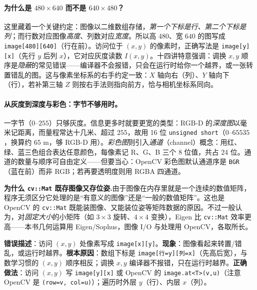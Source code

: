\paragraph{为什么是 $480\times640$ 而不是 $640\times480$？}
这里藏着一个关键约定\cite{gaoxiang2019slam14}：图像以二维数组存储，\emph{第一个下标是行、第二个下标是列}；而行数对应图像\emph{高度}、列数对应\emph{宽度}。所以高 $480$、宽 $640$ 的图写成 \texttt{image[480][640]}（行在前）。访问位于 $(x,y)$ 的像素时，正确写法是 \texttt{image[y][x]}（先行 $y$ 后列 $x$），它对应灰度读数 $I(x,y)$。十四讲特意强调\cite{gaoxiang2019slam14}：调换 $x,y$ 顺序是\emph{隐蔽}的常见错误——编译器不会报错，只会在运行时给你一个越界，或一张转置错乱的图。这与像素坐标系的右手约定一致：$X$ 轴向右（列）、$Y$ 轴向下（行），若补第三轴 $Z$ 则按右手法则指向前方，恰与相机坐标系同向。

\paragraph{从灰度到深度与彩色：字节不够用时。}
一字节（$0\text{–}255$）只够灰度。信息更多时就要更宽的类型\cite{gaoxiang2019slam14}：RGB-D 的\emph{深度图}以毫米记距离，而量程常达十几米、超过 $255$，故用 16 位 \texttt{unsigned short}（$0\text{–}65535$，换算约 $65$ m，够 RGB-D 用）。\emph{彩色图}则引入\emph{通道}（channel）概念：用红、绿、蓝三色组合表达任意颜色，每像素记 R、G、B 三个 8 位值，共占 24 位。通道的数量与顺序可自由定义——但要当心：OpenCV 彩色图默认通道序是 \texttt{BGR}（蓝在前）而非 RGB；若再要透明度则用 RGBA 四通道。

\begin{note}
\textbf{为什么 \texttt{cv::Mat} 既存图像又存位姿.}\;由于图像在内存里就是一个连续的数值矩阵，程序无须区分它处理的是“有意义的图像”还是“一般的数值矩阵”\cite{gaoxiang2019slam14}。这也是 OpenCV 的 \texttt{cv::Mat} 既能装图像、又能装位姿等矩阵数据的原因。不过一般认为，对\emph{固定大小}的小矩阵（如 $3\times3$ 旋转、$4\times4$ 变换），Eigen 比 \texttt{cv::Mat} 效率更高——本书几何运算用 Eigen/Sophus，图像 I/O 与处理用 OpenCV，各取所长。
\end{note}

\begin{pitfall}
\textbf{错误描述}：访问 $(x,y)$ 处像素写成 \texttt{image[x][y]}。\textbf{现象}：图像看起来转置/错乱，或运行时越界。\textbf{根本原因}：数组下标是 \texttt{image[行=y][列=x]}（先高后宽），与数学习惯的 $(x,y)$ 顺序相反；调换 $x,y$ 编译器不报错，只在运行时越界\cite{gaoxiang2019slam14}。\textbf{正确做法}：访问 $(x,y)$ 写 \texttt{image[y][x]} 或 OpenCV 的 \texttt{image.at<T>(v,u)}（注意 OpenCV 是 \texttt{(row=v, col=u)}）；遍历时外层 $y$（行）、内层 $x$（列）。
\end{pitfall}

